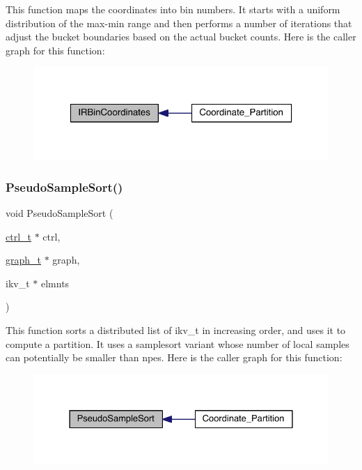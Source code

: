 This function maps the coordinates into bin numbers. It starts with a uniform distribution of the max-\/min range and then performs a number of iterations that adjust the bucket boundaries based on the actual bucket counts. Here is the caller graph for this function\+:\nopagebreak
\begin{figure}[H]
\begin{center}
\leavevmode
\includegraphics[width=320pt]{a00419_a868c9811f572c62917c5e8cc22dd92a9_icgraph}
\end{center}
\end{figure}
\mbox{\label{a00419_a2faf7ef22f45b689c53efc937cd67502}} 
\subsubsection{\texorpdfstring{Pseudo\+Sample\+Sort()}{PseudoSampleSort()}}
{\footnotesize\ttfamily void Pseudo\+Sample\+Sort (\begin{DoxyParamCaption}\item[{\hyperlink{a00742}{ctrl\+\_\+t} $\ast$}]{ctrl,  }\item[{\hyperlink{a00734}{graph\+\_\+t} $\ast$}]{graph,  }\item[{ikv\+\_\+t $\ast$}]{elmnts }\end{DoxyParamCaption})}

This function sorts a distributed list of ikv\+\_\+t in increasing order, and uses it to compute a partition. It uses a samplesort variant whose number of local samples can potentially be smaller than npes. Here is the caller graph for this function\+:\nopagebreak
\begin{figure}[H]
\begin{center}
\leavevmode
\includegraphics[width=328pt]{a00419_a2faf7ef22f45b689c53efc937cd67502_icgraph}
\end{center}
\end{figure}
\mbox{\label{a00419_a7e9cbe6e63b34b8d6e9e7bd03445e4c4}} 
